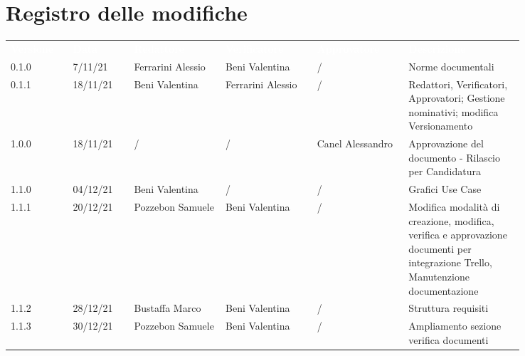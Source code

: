 \section*{Registro delle modifiche}

{\renewcommand{\arraystretch}{1.5}
\scriptsize
\begin{tabular}{p{0.10\linewidth}p{0.10\linewidth}p{0.15\linewidth}p{0.15\linewidth}p{0.15\linewidth}p{0.19\linewidth}}
	\rowcolor[RGB]{33, 73, 50}
	\textcolor{white}{\textbf{Versione}} & \textcolor{white}{\textbf{Data}} & \textcolor{white}
	{\textbf{Redattore}} & \textcolor{white}{\textbf{Verificatore}} & \textcolor{white}{\textbf{Approvatore}} & \textcolor{white}
	{\textbf{Descrizione}}\\
	\rowcolor[RGB]{216, 235, 171}
	0.1.0 & 7/11/21 & Ferrarini Alessio & Beni Valentina & / & Norme documentali\\
	\rowcolor[RGB]{233, 245, 206}
	0.1.1 & 18/11/21 & Beni Valentina & Ferrarini Alessio & / & Redattori, Verificatori, Approvatori; Gestione nominativi; modifica Versionamento\\
	\rowcolor[RGB]{216, 235, 171}
	1.0.0 & 18/11/21 & / & / & Canel Alessandro & Approvazione del documento - Rilascio per Candidatura\\
	\rowcolor[RGB]{233, 245, 206}
	1.1.0 & 04/12/21 & Beni Valentina & / & / & Grafici Use Case \\
	\rowcolor[RGB]{216, 235, 171}
	1.1.1 & 20/12/21 & Pozzebon Samuele & Beni Valentina & / & Modifica modalità di	creazione, modifica, verifica e approvazione documenti per integrazione Trello, Manutenzione documentazione\\
	\rowcolor[RGB]{233, 245, 206}
	1.1.2 & 28/12/21 & Bustaffa Marco & Beni Valentina & / & Struttura requisiti\\
	\rowcolor[RGB]{216, 235, 171}
	1.1.3 & 30/12/21 & Pozzebon Samuele & Beni Valentina & / & Ampliamento sezione verifica documenti
\end{tabular}	
}